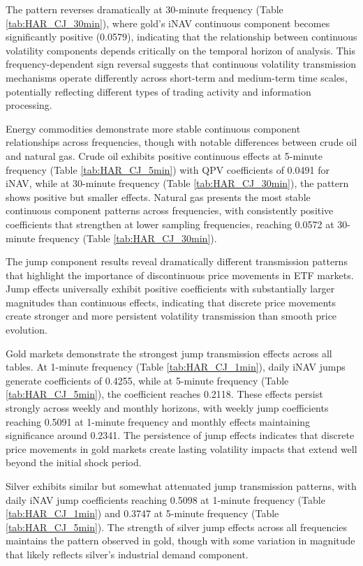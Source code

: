 The pattern reverses dramatically at 30-minute frequency (Table \ref{tab:HAR_CJ_30min}), where gold's iNAV continuous component becomes significantly positive (0.0579), indicating that the relationship between continuous volatility components depends critically on the temporal horizon of analysis. This frequency-dependent sign reversal suggests that continuous volatility transmission mechanisms operate differently across short-term and medium-term time scales, potentially reflecting different types of trading activity and information processing.

Energy commodities demonstrate more stable continuous component relationships across frequencies, though with notable differences between crude oil and natural gas. Crude oil exhibits positive continuous effects at 5-minute frequency (Table \ref{tab:HAR_CJ_5min}) with QPV coefficients of 0.0491 for iNAV, while at 30-minute frequency (Table \ref{tab:HAR_CJ_30min}), the pattern shows positive but smaller effects. Natural gas presents the most stable continuous component patterns across frequencies, with consistently positive coefficients that strengthen at lower sampling frequencies, reaching 0.0572 at 30-minute frequency (Table \ref{tab:HAR_CJ_30min}).

The jump component results reveal dramatically different transmission patterns that highlight the importance of discontinuous price movements in ETF markets. Jump effects universally exhibit positive coefficients with substantially larger magnitudes than continuous effects, indicating that discrete price movements create stronger and more persistent volatility transmission than smooth price evolution.

Gold markets demonstrate the strongest jump transmission effects across all tables. At 1-minute frequency (Table \ref{tab:HAR_CJ_1min}), daily iNAV jumps generate coefficients of 0.4255, while at 5-minute frequency (Table \ref{tab:HAR_CJ_5min}), the coefficient reaches 0.2118. These effects persist strongly across weekly and monthly horizons, with weekly jump coefficients reaching 0.5091 at 1-minute frequency and monthly effects maintaining significance around 0.2341. The persistence of jump effects indicates that discrete price movements in gold markets create lasting volatility impacts that extend well beyond the initial shock period.

Silver exhibits similar but somewhat attenuated jump transmission patterns, with daily iNAV jump coefficients reaching 0.5098 at 1-minute frequency (Table \ref{tab:HAR_CJ_1min}) and 0.3747 at 5-minute frequency (Table \ref{tab:HAR_CJ_5min}). The strength of silver jump effects across all frequencies maintains the pattern observed in gold, though with some variation in magnitude that likely reflects silver's industrial demand component.

